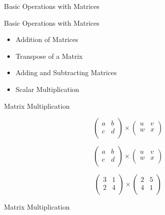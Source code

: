 \documentclass[]{report}
\begin{document}
{
	{Basic Operations with Matrices  }
{
	{Basic Operations with Matrices }
	
	\begin{itemize}
		\item Addition of Matrices
		\item Transpose of a Matrix
		\item Adding and Subtracting Matrices
		\item Scalar Multiplication
	\end{itemize}
}

{
	
	{Matrix Multiplication}
	{
		
		\[ \left(
		\begin{array}{cc}
		a & b \\
		c & d \\
		\end{array}
		\right) \times \left(
		\begin{array}{cc}
		u & v \\
		w & x \\
		\end{array}
		\right)
		\]
		
		
		
		\[ \left(
		\begin{array}{cc}
		a & b \\
		c & d \\
		\end{array}
		\right) \times \left(
		\begin{array}{cc}
		u & v \\
		w & x \\
		\end{array}
		\right)
		\]
		
		
		
		\[ \left(
		\begin{array}{cc}
		3 & 1 \\
		2 & 4 \\
		\end{array}
		\right) \times \left(
		\begin{array}{cc}
		2 & 5 \\
		4 & 1 \\
		\end{array}
		\right)
		\]
		
		{Matrix Multiplication}
		
		{\huge
			
}}}}
\end{document}
